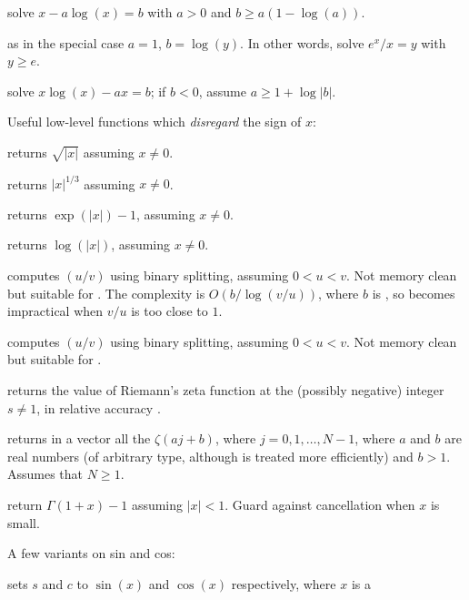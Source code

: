 solve $x - a  \log(x) = b$ with $a > 0$ and $b \geq a (1 - \log(a))$.

 as 
in the special case $a = 1$, $b = \log(y)$. In other words,
solve $e^x / x = y$ with $y \geq e$.

solve $x  \log(x) - a  x = b$; if $b < 0$, assume $a \geq 1 + \log |b|$.

\noindent Useful low-level functions which \emph{disregard} the sign of $x$:

 returns $\sqrt{|x|}$ assuming $x\neq 0$.

 returns $|x|^{1/3}$ assuming $x\neq 0$.

 returns $\exp(|x|) - 1$, assuming $x \neq 0$.

 returns $\log(|x|)$, assuming $x \neq 0$.


 computes $(u/v)$
using binary splitting, assuming $0 < u < v$. Not memory clean but suitable
for . The complexity is $O(b / \log(v/u))$, where $b$ is
, so becomes impractical when $v/u$ is too close to
$1$.

 computes $(u/v)$
using binary splitting, assuming $0 < u < v$. Not memory clean but suitable
for .

 returns the value of Riemann's zeta
function at the (possibly negative) integer $s\neq 1$, in relative accuracy
.

 returns in a vector
all the $\zeta(aj + b)$, where $j = 0, 1, \dots, N-1$, where $a$ and $b$ are
real numbers (of arbitrary type, although  is treated more
efficiently) and $b > 1$. Assumes that $N \geq 1$.

 return $\Gamma(1+x) - 1$ assuming
$|x| < 1$. Guard against cancellation when $x$ is small.

\noindent A few variants on sin and cos:

 sets $s$ and $c$ to
$\sin(x)$ and $\cos(x)$ respectively, where $x$ is a 

